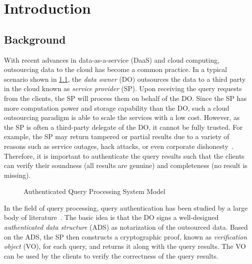 \chapter{Introduction}\label{chap:intro}

\section{Background}

With recent advances in data-as-a-service (DaaS) and cloud computing, outsourcing data to the cloud has become a common practice. In a typical scenario shown in \cref{fig:intro:model}, the \emph{data owner} (DO) outsources the data to a third party in the cloud known as \emph{service provider} (SP). Upon receiving the query requests from the clients, the SP will process them on behalf of the DO\@. Since the SP has more computation power and storage capability than the DO, such a cloud outsourcing paradigm is able to scale the services with a low cost. However, as the SP is often a third-party delegate of the DO, it cannot be fully trusted. For example, the SP may return tampered or partial results due to a variety of reasons such as service outages, hack attacks, or even corporate dishonesty~\cite{arXiv:1808.08313}. Therefore, it is important to authenticate the query results such that the clients can verify their soundness (all results are genuine) and completeness (no result is missing).

\begin{figure}[h]
  \centering
  \resizebox{.7\linewidth}{!}{}
  \caption{Authenticated Query Processing System Model}\label{fig:intro:model}
\end{figure}

In the field of query processing, query authentication has been studied by a large body of literature~\cite{10.1109/ICDE.2004.1320027,10.1145/1142473.1142488,10.1007/s00778-008-0113-2,10.1145/1880022.1880026,10.1145/2213836.2213871,10.1145/2463676.2465281,10.14778/2732219.2732224,10.1145/2664243.2664244,10.1145/2723372.2747649,10.1109/tkde.2014.2316818}. The basic idea is that the DO signs a well-designed \emph{authenticated data structure} (ADS) as notarization of the outsourced data. Based on the ADS, the SP then constructs a cryptographic proof, known as \emph{verification object} (VO), for each query, and returns it along with the query results. The VO can be used by the clients to verify the correctness of the query results.

